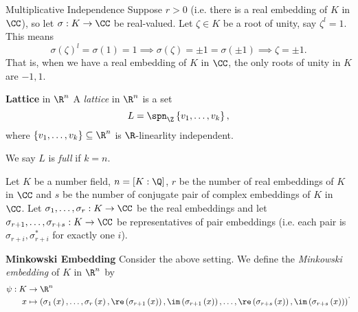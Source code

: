 \documentclass[pmath441]{subfiles}
\begin{document}
\begin{remark}{Multiplicative Independence}
        Suppose $r>0$ (i.e. there is a real embedding of $K$ in $\CC$), so let $\sigma:K\to\CC$ be real-valued. Let $\zeta\in K$ be a root of unity, say $\zeta^l=1$. This means
        \begin{equation*}
            \sigma\left( \zeta \right)^l = \sigma\left( 1 \right) = 1 \implies \sigma\left( \zeta \right) = \pm 1 = \sigma\left( \pm 1 \right) \implies \zeta = \pm 1.
        \end{equation*}
        That is, when we have a real embedding of $K$ in $\CC$, the only roots of unity in $K$ are $-1,1$.
    \end{remark}
    
    \begin{definition}{\textbf{Lattice} in $\R^n$}
        A \emph{lattice} in $\R^n$ is a set
        \begin{equation*}
            L = \spn_{\Z}\left\lbrace v_1,\ldots,v_k \right\rbrace,
        \end{equation*}
        where $\left\lbrace v_1,\ldots,v_k \right\rbrace\subseteq\R^n$ is $\R$-linearlity independent. 

        We say $L$ is \emph{full} if $k=n$.
    \end{definition}

    \np Let $K$ be a number field, $n=\left[ K:\Q \right]$, $r$ be the number of real embeddings of $K$ in $\CC$ and $s$ be the number of conjugate pair of complex embeddings of $K$ in $\CC$. Let $\sigma_1,\ldots,\sigma_r:K\to\CC$ be the real embeddings and let $\sigma_{r+1},\ldots,\sigma_{r+s}:K\to\CC$ be representatives of pair embeddings (i.e. each pair is $\sigma_{r+i},\sigma_{r+i}^{*}$ for exactly one $i$).

    \clearpage
    \begin{definition}{\textbf{Minkowski Embedding}}
        Consider the above setting. We define the \emph{Minkowski embedding} of $K$ in $\R^n$ by
        \begin{equation*}
            \begin{aligned}
                \psi:K&\to\R^n \\
                x & \mapsto \left( \sigma_1\left( x \right),\ldots,\sigma_r\left( x \right),\re\left( \sigma_{r+1}\left( x \right) \right),\im\left( \sigma_{r+1}\left( x \right) \right),\ldots,\re\left( \sigma_{r+s}\left( x \right) \right),\im\left( \sigma_{r+s}\left( x \right) \right) \right)
            \end{aligned} .
        \end{equation*}
    \end{definition}
\end{document}
